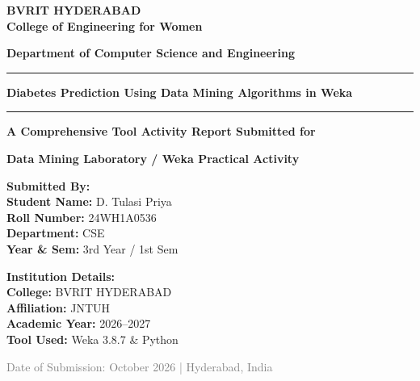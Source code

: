 \documentclass[11pt,a4paper]{article}
\begin{document}
\begin{titlepage}
    \centering
    \vspace*{0.3cm}
    {\Huge \bfseries \color{blue!80!black} BVRIT HYDERABAD\\ \Large College of Engineering for Women \par}
    \vspace{0.3cm}
    {\large \textbf{Department of Computer Science and Engineering} \par}
    \vspace{1.2cm}
    \rule{\textwidth}{1.5pt} \par
    \vspace{0.4cm}
    {\LARGE \bfseries Diabetes Prediction Using Data Mining Algorithms in Weka \par}
    \vspace{0.3cm}
    \rule{\textwidth}{1.5pt} \par
    \vspace{1.0cm}
    {\large \textbf{A Comprehensive Tool Activity Report Submitted for} \par}
    \vspace{0.2cm}
    {\Large \textbf{Data Mining Laboratory / Weka Practical Activity} \par}
    \vspace{1.8cm}
    \begin{minipage}{0.48\textwidth}
        \textbf{Submitted By:}\\[0.2cm]
        \textbf{Student Name:} D. Tulasi Priya\\
        \textbf{Roll Number:} 24WH1A0536\\
        \textbf{Department:} CSE\\
        \textbf{Year \& Sem:} 3rd Year / 1st Sem
    \end{minipage}
    \hfill
    \begin{minipage}{0.48\textwidth}
        \begin{flushright}
        \textbf{Institution Details:}\\[0.2cm]
        \textbf{College:} BVRIT HYDERABAD\\
        \textbf{Affiliation:} JNTUH\\
        \textbf{Academic Year:} 2026--2027\\
        \textbf{Tool Used:} Weka 3.8.7 \& Python
        \end{flushright}
    \end{minipage}
    \vfill
    {\small \textcolor{gray}{Date of Submission: October 2026 | Hyderabad, India} \par}
\end{titlepage}
\end{document}

